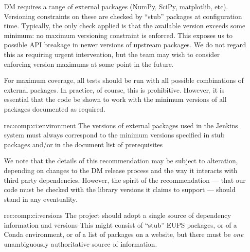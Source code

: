 DM requires a range of external packages (NumPy, SciPy, matplotlib, etc).
Versioning constraints on these are checked by ``stub'' packages at configuration time.
Typically, the only check applied is that the available version exceeds some minimum: no maximum versioning constraint is enforced.
This exposes us to possible API breakage in newer versions of upstream packages.
We do not regard this as requiring urgent intervention, but the team may wish to consider enforcing version maximums at some point in the future.

For maximum coverage, all tests should be run with all possible combinations of external packages.
In practice, of course, this is prohibitive.
However, it is essential that the code be shown to work with the minimum versions of all packages documented as required.

\begin{recommendation}
    {rec:comp:ci:environment}
    {The versions of external packages used in the Jenkins system must always correspond to the minimum versions specified in stub packages and/or in the document list of prerequisites}
\end{recommendation}

We note that the details of this recommendation may be subject to alteration, depending on changes to the DM release process and the way it interacts with third party dependencies.
However, the spirit of the recommendation --- that our code must be checked with the library versions it claims to support --- should stand in any eventuality.

\begin{recommendation}
    {rec:comp:ci:versions}
    {The project should adopt a single source of dependency information and versions}
This might consist of ``stub'' EUPS packages, or of a Conda environment, or of a list of packages on a website, but there must be \emph{one} unambiguously authoritative source of information.
\end{recommendation}
